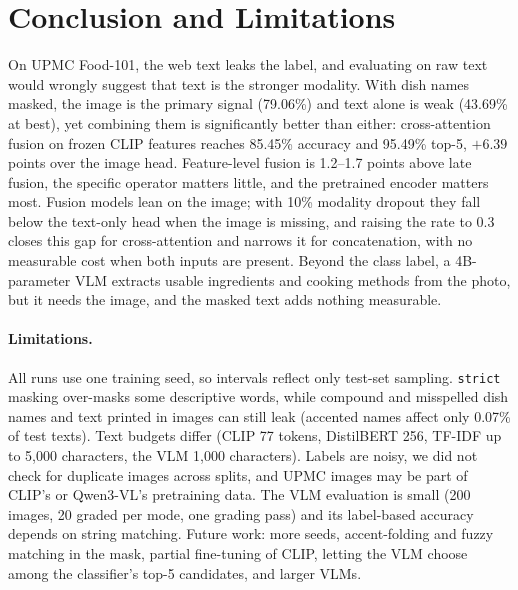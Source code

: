 \documentclass[11pt,a4paper]{article}
\begin{document}
\section{Conclusion and Limitations}

On UPMC Food-101, the web text leaks the label, and evaluating on raw text would wrongly suggest that text is the
stronger modality. With dish names masked, the image is the primary signal (79.06\%) and text alone is weak
(43.69\% at best), yet combining them is significantly better than either: cross-attention fusion on frozen CLIP
features reaches 85.45\% accuracy and 95.49\% top-5, $+6.39$ points over the image head. Feature-level fusion is
1.2--1.7 points above late fusion, the specific operator matters little, and the pretrained encoder matters most.
Fusion models lean on the image; with 10\% modality dropout they fall below the text-only head when the image is
missing, and raising the rate to 0.3 closes this gap for cross-attention and narrows it for concatenation, with no
measurable cost when both inputs are present. Beyond the class label, a 4B-parameter VLM extracts
usable ingredients and cooking methods from the photo, but it needs the image, and the masked text adds nothing
measurable.

\paragraph{Limitations.}
All runs use one training seed, so intervals reflect only test-set sampling. \texttt{strict} masking over-masks
some descriptive words, while compound and misspelled dish names and text printed in images can still leak (accented
names affect only 0.07\% of test texts).
Text budgets differ (CLIP 77 tokens, DistilBERT 256, TF-IDF up to 5,000 characters, the VLM 1,000 characters).
Labels are noisy, we did not check for duplicate images across splits, and UPMC images may be part of CLIP's or
Qwen3-VL's pretraining data. The VLM evaluation is small (200 images, 20 graded per mode, one grading pass) and its
label-based accuracy depends on string matching. Future work: more seeds, accent-folding and fuzzy matching in the mask,
partial fine-tuning of CLIP, letting the VLM choose among the classifier's top-5 candidates, and larger VLMs.
\end{document}
